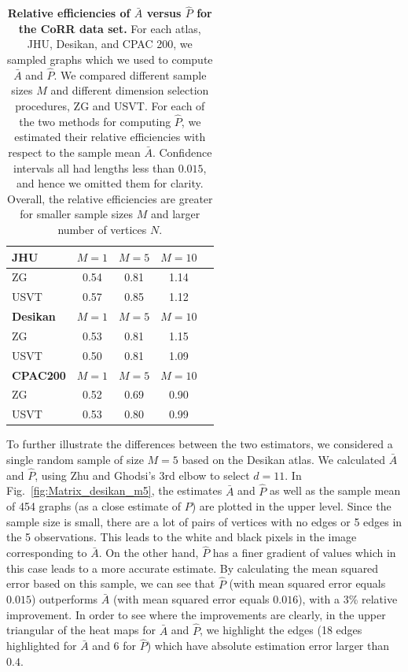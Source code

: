\documentclass[10pt,letterpaper]{article}
\renewcommand{\hat}{\widehat}
\begin{document}
\begin{table}[!tb]
    \centering
\begin{tabular}{lcccc}\toprule
\multicolumn{1}{l}{\textbf{JHU}} & $M=1$  & $M=5$  & $M=10$ \\\midrule
ZG      & 0.54 & 0.81 & 1.14  \\
USVT    & 0.57 & 0.85 & 1.12 \\\midrule
\multicolumn{1}{l}{\textbf{Desikan}} & $M=1$  & $M=5$  & $M=10$ \\ \midrule
ZG      & 0.53 & 0.81 & 1.15 \\
USVT    & 0.50 & 0.81 & 1.09 \\\midrule
\multicolumn{1}{l}{\textbf{CPAC200}} & $M=1$  & $M=5$  & $M=10$ \\\midrule
ZG      & 0.52 & 0.69 & 0.90 \\
USVT    & 0.53 & 0.80 & 0.99 \\\bottomrule
\end{tabular}
    \caption{{\bf Relative efficiencies of $\bar{A}$ versus $\hat{P}$ for the CoRR data set.}
    For each atlas, JHU, Desikan, and CPAC 200, we sampled graphs which we used to compute $\bar{A}$ and $\hat{P}$.
     We compared different sample sizes $M$ and different dimension selection procedures, ZG and USVT.
    For each of the two methods for computing $\hat{P}$, we estimated their relative efficiencies with respect to the sample mean $\bar{A}$.
    Confidence intervals all had lengths less than $0.015$, and hence we omitted them for clarity.
    Overall, the relative efficiencies are greater for smaller sample sizes $M$ and larger number of vertices $N$.
    } 
    \label{tab:corr_re}
\end{table}





To further illustrate the differences between the two estimators, we considered a single random sample of size $M=5$ based on the Desikan atlas.
We calculated $\bar{A}$ and $\hat{P}$, using  Zhu and Ghodsi's 3rd elbow to select $d=11$. 
In Fig.~\ref{fig:Matrix_desikan_m5}, the estimates $\bar{A}$ and $\hat{P}$ as well as the sample mean of 454 graphs (as a close estimate of $P$) are plotted in the upper level. 
Since the sample size is small, there are a lot of pairs of vertices with no edges or 5 edges in the 5 observations.
This leads to the white and black pixels in the image corresponding to $\bar{A}$.
On the other hand, $\hat{P}$ has a finer gradient of values which in this case leads to a more accurate estimate.
By calculating the mean squared error based on this sample, we can see that $\hat{P}$ (with mean squared error equals $0.015$) outperforms $\bar{A}$ (with mean squared error equals $0.016$), with a 3\% relative improvement.
In order to see where the improvements are clearly, in the upper triangular of the heat maps for $\bar{A}$ and $\hat{P}$, we highlight the edges (18 edges highlighted for $\bar{A}$ and 6 for $\hat{P}$) which have absolute estimation error larger than $0.4$.
\end{document}
